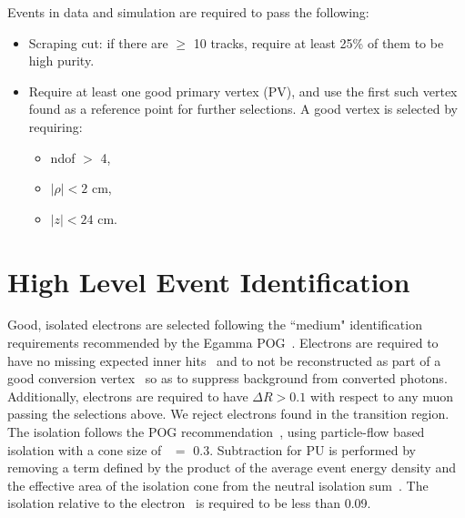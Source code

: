 Events in data and simulation are required to pass the following:

\begin{itemize}
\item Scraping cut: if there are $\geq$ 10 tracks, require at least 25\% of them to be high purity. 
\item Require at least one good primary vertex (PV), and use the first such vertex found as a reference point for further selections.  A good vertex is selected by requiring:
	\begin{itemize}
	\item ndof $>$ 4,
	\item $|\rho| < 2$ cm,
	\item $|z| < 24$ cm.  
	\end{itemize}
\end{itemize}
	 
	 
\section{High Level Event Identification}	 
\label{sec:EventSelections}
Good, isolated electrons are selected following the ``medium" identification requirements recommended by the Egamma POG~\cite{egammaidtwiki}.
Electrons are required to have no missing expected inner hits~\cite{conv} and to not be reconstructed as part of a good conversion vertex~\cite{hwwsmurf} so as to suppress background from converted photons.
Additionally, electrons are required to have $\Delta R >0.1$ with respect to any muon passing the selections above.
We reject electrons found in the transition region.
The isolation follows the POG recommendation~\cite{egammapfisotwiki}, using particle-flow based isolation with a cone size of \DR\  $=$ 0.3.  
Subtraction for PU is performed by removing a term defined by the product of the average event energy density and the effective area of the isolation cone from the neutral isolation sum~\cite{egammaisorhoaeff}.
The isolation relative to the electron \pt\ is required to be less than 0.09.\\

